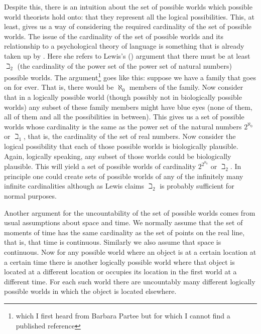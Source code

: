 Despite this, there is an intuition about the set of possible worlds
which possible world theorists hold onto:  that they represent all the
logical possibilities.  This, at least, gives us a way of considering
the required cardinality of the set of possible worlds.  The issue of
the cardinality of the set of possible worlds and its relationship to
a psychological theory of language is something that is already taken
up by \cite{Partee1977}.  Here she refers to Lewis's
(\citeyear{Lewis1973}) argument that there must be at least $\beth_2$
(the cardinality of the power set of the power set of natural numbers)
possible worlds.  The argument\footnote{which I first heard from
  Barbara Partee but for which I cannot find a published reference} goes like this:  suppose we have a
family that goes on for ever.  That is, there would be $\aleph_0$
members of the family.  Now consider that in a logically possible
world (though possibly not in biologically possible worlds) any subset
of these family members might have blue eyes (none of them, all of
them and all the possibilities in between).  This gives us a set of
possible worlds whose cardinality is the same as the power set of the
natural numbers $2^{\aleph_0}$ or $\beth_1$, that is, the cardinality of the set of real numbers.
Now consider the logical possibility that each of those possible
worlds is biologically plausible.  Again, logically speaking, any subset
of those worlds could be biologically plausible.  This will yield a set of possible worlds
of cardinality $2^{2^{\aleph_0}}$ or $\beth_2$.  In principle one
could create sets of possible worlds of any of the infinitely many
infinite cardinalities although as Lewis claims $\beth_2$ is probably
sufficient for normal purposes.

Another argument for the uncountability of the set of possible worlds
comes from usual assumptions about space and time.  We normally assume
that the set of moments of time has the same cardinality as the
set of points on the real line, that is, that time is continuous.
Similarly we also assume that space is continuous.  Now
for any possible world where an object is at a certain location at a
certain time there is another logically possible world where that
object is located at a different location or occupies its location in
the first world at a different time.  For each such world
there are uncountably many different logically possible worlds in
which the object is located elsewhere.

